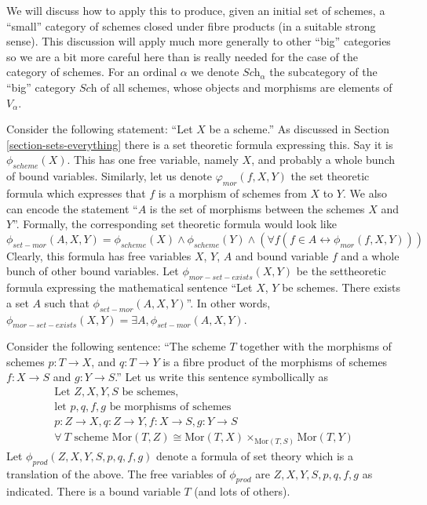 \noindent
We will discuss how to apply this to produce, given an initial
set of schemes, a ``small'' category of schemes closed under
fibre products (in a suitable strong sense). This discussion will
apply much more generally to other ``big'' categories so we are
a bit more careful here than is really needed for the case of the
category of schemes. For an ordinal
$\alpha$ we denote $\textit{Sch}_\alpha$ the subcategory
of the ``big'' category $\textit{Sch}$ of all schemes, whose
objects and morphisms are elements of $V_\alpha$.

\medskip\noindent
Consider the following statement: ``Let $X$ be a scheme.''
As discussed in Section \ref{section-sets-everything}
there is a set theoretic formula expressing this.
Say it is $\phi_{scheme}(X)$.
This has one free variable, namely $X$, and probably
a whole bunch of bound variables. Similarly, let us denote
$\varphi_{mor}(f, X, Y)$ the set theoretic formula
which expresses that $f$ is a morphism of schemes
from $X$ to $Y$. We also can encode the statement
``$A$ is the set of morphisms between the schemes $X$ and $Y$''.
Formally, the corresponding set theoretic formula would look
like
$$
\phi_{set-mor}(A, X, Y) = 
\phi_{scheme}(X) \wedge \phi_{scheme}(Y) \wedge
(\forall f (f \in A \leftrightarrow \phi_{mor}(f, X, Y)))
$$
Clearly, this formula has free variables $X$, $Y$, $A$ and bound variable
$f$ and a whole bunch of other bound variables. Let
$\phi_{mor-set-exists}(X, Y)$
be the settheoretic formula expressing the mathematical sentence
``Let $X$, $Y$ be schemes. There exists a set $A$ such that
$\phi_{set-mor}(A, X, Y)$''. In other words,
$\phi_{mor-set-exists}(X, Y) = \exists A, \phi_{set-mor}(A, X, Y)$.

\medskip\noindent
Consider the following sentence: ``The scheme $T$ together
with the morphisms of schemes $p : T \to X$, and $q : T \to Y$ is a
fibre product of the morphisms of schemes $f : X \to S$ and
$g : Y \to S$.'' Let us write this sentence symbollically as
\begin{eqnarray*}
\text{Let } Z, X, Y, S \text{ be schemes}, \\
\text{let } p, q, f, g \text{ be morphisms of schemes} \\
p : Z \to X, q : Z \to Y, f : X \to S, g : Y \to S \\
\forall\ T \text{ scheme }
\text{Mor}(T, Z) \cong
\text{Mor}(T,X) \times_{\text{Mor}(T,S)} \text{Mor}(T, Y)
\end{eqnarray*}
Let $\phi_{prod}(Z, X, Y, S, p, q, f, g)$ denote a formula of set
theory which is a translation of the above. The free variables of
$\phi_{prod}$ are $Z, X, Y, S, p, q, f, g$ as indicated.
There is a bound variable $T$ (and lots of others).

